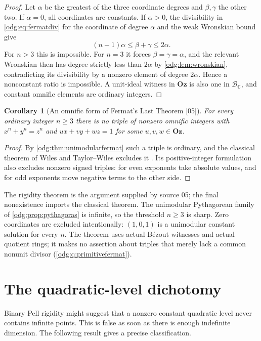 \documentclass[11pt,oneside]{article}
\numberwithin{equation}{section}
\newtheorem{corollary}[corollary]{Corollary}
\theoremstyle{definition}
\theoremstyle{remark}
\newcommand{\Oz}{\mathbf{Oz}}
\newcommand{\C}{\mathbb C}
\newcommand{\BC}{\mathcal B_{\C}}
\newcommand{\src}[1]{\textup{\textsf{\small[#1]}}}
\begin{document}
\begin{proof}
Let $\alpha$ be the greatest of the three coordinate
degrees and $\beta,\gamma$ the other two. If $\alpha=0$, all coordinates are
constants. If $\alpha>0$, the divisibility in \eqref{odg:eq:fermatdiv} for
the coordinate of degree $\alpha$ and the weak Wronskian bound give
\[
 (n-1)\alpha\le\beta+\gamma\le2\alpha .
\]
For $n>3$ this is impossible. For $n=3$ it forces $\beta=\gamma=\alpha$, and
the relevant Wronskian then has degree strictly less than $2\alpha$ by
\cref{odg:lem:wronskian}, contradicting its divisibility by a nonzero element
of degree $2\alpha$. Hence a nonconstant ratio is impossible. A unit-ideal
witness in $\Oz$ is also one in $\BC$, and constant omnific elements are
ordinary integers.
\end{proof}

\begin{corollary}[An omnific form of Fermat's Last Theorem \src{05}]\label{odg:cor:flt}
For every ordinary integer $n\ge3$ there is no triple of nonzero omnific
integers with $x^n+y^n=z^n$ and $ux+vy+wz=1$ for some $u,v,w\in\Oz$.
\end{corollary}
\begin{proof}
By \cref{odg:thm:unimodularfermat} such a triple is ordinary, and the
classical theorem of Wiles and Taylor--Wiles excludes it
\cite{Wiles,TaylorWiles}. Its positive-integer formulation also excludes
nonzero signed triples: for even exponents take absolute values, and for odd
exponents move negative terms to the other side.
\end{proof}

The rigidity theorem is the argument supplied by source 05; the final
nonexistence imports the classical theorem. The unimodular Pythagorean family
of \cref{odg:prop:pythagoras} is infinite, so the threshold $n\ge3$ is sharp.
Zero coordinates are excluded intentionally: $(1,0,1)$ is a unimodular
constant solution for every $n$. The theorem uses actual B\'ezout witnesses
and actual quotient rings; it makes no assertion about triples that merely
lack a common nonunit divisor (\cref{odg:q:primitivefermat}).

\section{The quadratic-level dichotomy}\label{odg:sec:quadratic}

Binary Pell rigidity might suggest that a nonzero constant quadratic level
never contains infinite points. This is false as soon as there is enough
indefinite dimension. The following result gives a precise classification.
\end{document}
